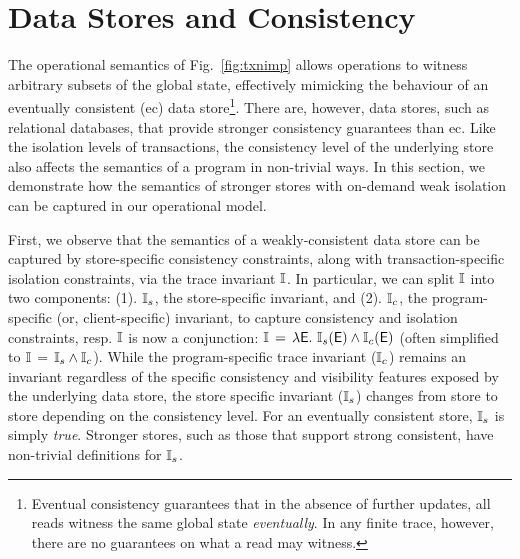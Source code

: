 \section{Data Stores and Consistency}
\label{sec:store-consistency}

The operational semantics of Fig.~\ref{fig:txnimp} allows operations
to witness arbitrary subsets of the global state, effectively mimicking the
behaviour of an eventually consistent ({\sc ec}) data
store\footnote{Eventual consistency guarantees that in the absence of further
  updates, all reads witness the same global state
  \emph{eventually}. In any finite trace, however, there are no
  guarantees on what a read may witness.}. There are, however, data stores,
such as relational databases, that provide stronger consistency
guarantees than {\sc ec}. Like the isolation levels of transactions,
the consistency level of the underlying store also affects the
semantics of a program in non-trivial ways. In this section, we
demonstrate how the semantics of stronger stores with on-demand weak
isolation can be captured in our operational model. 


First, we observe that the semantics of a weakly-consistent data store
can be captured by store-specific consistency constraints, along with
transaction-specific isolation constraints, via the trace invariant
$\mathbb{I}$. In particular, we can split $\mathbb{I}$ into two components: (1).
$\mathbb{I}_s$, the store-specific invariant, and (2). $\mathbb{I}_c$, the
program-specific (or, client-specific) invariant, to capture
consistency and isolation constraints, resp.  $\mathbb{I}$ is now a
conjunction: $\mathbb{I} \,=\, \lambda\textsf{E}.~\mathbb{I}_s(\textsf{E}) \wedge \mathbb{I}_c(\textsf{E})$ (often
simplified to $\mathbb{I} \,=\, \mathbb{I}_s\wedge\mathbb{I}_c$).  While the program-specific
trace invariant ($\mathbb{I}_c$) remains an invariant regardless of the
specific consistency and visibility features exposed by the underlying
data store, the store specific invariant ($\mathbb{I}_s$) changes from store
to store depending on the consistency level.  For an eventually
consistent store, $\mathbb{I}_s$ is simply \emph{true}. Stronger stores, such
as those that support strong consistent, have non-trivial definitions
for $\mathbb{I}_s$.

